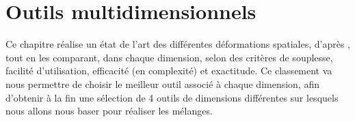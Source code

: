 
\chapter{Outils multidimensionnels}

\graphicspath{{Chapter1/Chapter1Figs/PNG/}{Chapter1/Chapter1Figs/PDF/}{Chapter1/Chapter1Figs/}}

Ce chapitre réalise un état de l'art des différentes déformations
spatiales, d'après \cite{GB08}, tout en les comparant, dans chaque
dimension, selon des critères de souplesse, facilité d'utilisation,
efficacité (en complexité) et exactitude. Ce classement va nous
permettre de choisir le meilleur outil associé à chaque dimension,
afin d'obtenir à la fin une sélection de 4 outils de dimensions
différentes sur lesquels nous allons nous baser pour réaliser les
mélanges.

